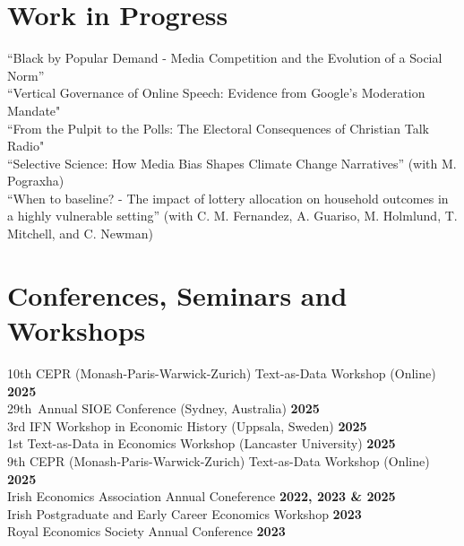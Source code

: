 \documentclass{resume}
\begin{document}
\section{Work in Progress}
\begin{content}
	{``Black by Popular Demand - Media Competition and the Evolution of a Social Norm''}\\
	{``Vertical Governance of Online Speech: Evidence from Google’s Moderation Mandate"}\\
	{``From the Pulpit to the Polls: The Electoral Consequences of Christian Talk Radio"}\\
	{``Selective Science: How Media Bias Shapes Climate Change Narratives'' (with M. Pograxha)}\\
	{``When to baseline? - The impact of lottery allocation on household outcomes in a highly vulnerable setting'' (with C. M. Fernandez, A. Guariso, M. Holmlund, T. Mitchell, and C. Newman)}\\
\sectionlineskip
\end{content}
\vspace{-3\medskipamount}

\section{Conferences, Seminars and Workshops} 
\begin{content}
    {10th CEPR (Monash-Paris-Warwick-Zurich) Text-as-Data Workshop (Online)} \hfill {\bf 2025} \\
    {29th Annual SIOE Conference (Sydney, Australia)} \hfill {\bf 2025} \\
    {3rd IFN Workshop in Economic History (Uppsala, Sweden)} \hfill {\bf 2025} \\
    {1st Text-as-Data in Economics Workshop (Lancaster University)} \hfill {\bf 2025} \\
    {9th CEPR (Monash-Paris-Warwick-Zurich) Text-as-Data Workshop (Online)} \hfill {\bf 2025} \\
    {Irish Economics Association Annual Coneference} \hfill {\bf 2022, 2023 \& 2025} \\
    {Irish Postgraduate and Early Career Economics Workshop} \hfill {\bf 2023}\\
    {Royal Economics Society Annual Conference} \hfill {\bf 2023} \\
\sectionlineskip
\end{content}
\vspace{-3\medskipamount}
\end{document}
